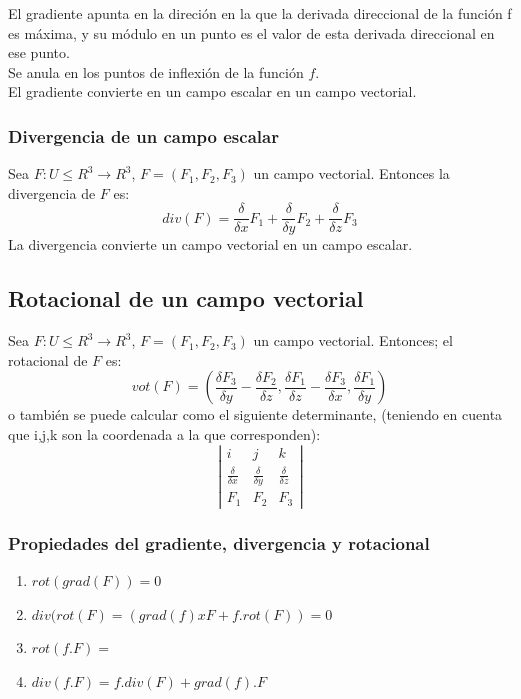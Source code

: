 El gradiente apunta en la direci\'on en la que la derivada direccional de la funci\'on f es m\'axima, y su m\'odulo en un punto es el valor de esta derivada direccional en ese punto. \\
Se anula en los puntos de inflexi\'on de la funci\'on $f$.\\
El gradiente convierte en un campo escalar en un campo vectorial.

\subsubsection*{Divergencia de un campo escalar}
Sea $F:U\leq R^3\rightarrow R^3$, $F=(F_1,F_2,F_3)$ un campo vectorial. Entonces la divergencia de $F$ es:
\begin{displaymath}
div(F)=\frac{\delta}{\delta x}F_1+\frac{\delta}{\delta y}F_2+\frac{\delta}{\delta z}F_3
\end{displaymath}
La divergencia convierte un campo vectorial en un campo escalar.
\subsection*{Rotacional de un campo vectorial}
Sea $F:U\leq R^3\rightarrow R^3$, $F=(F_1,F_2,F_3)$ un campo vectorial. Entonces; el rotacional de $F$ es:
\begin{displaymath}
vot(F)=\left(\frac{\delta F_3}{\delta y}-\frac{\delta F_2}{\delta z},\frac{\delta F_1}{\delta z}-\frac{\delta F_3}{\delta x},\frac{\delta F_1}{\delta y} \right)
\end{displaymath}
o tambi\'en se puede calcular como el siguiente determinante, (teniendo en cuenta que i,j,k son la coordenada a la que corresponden):
\begin{displaymath}
\left| \begin{matrix}
i & j & k \\
\frac{\delta}{\delta x} & \frac{\delta}{\delta y} & \frac{\delta}{\delta z} \\
F_1 & F_2 & F_3

\end{matrix} \right|
\end{displaymath}

\subsubsection*{Propiedades del gradiente, divergencia y rotacional}
\begin{enumerate}
\item $rot(grad(F))=0$
\item $div(rot(F)=(grad(f)xF+f.rot(F))=0$
\item $rot(f.F)=$
\item $div(f.F)=f.div(F)+grad(f).F$
\end{enumerate}

